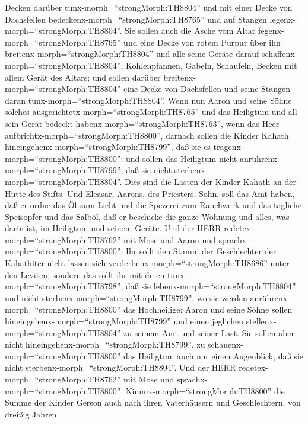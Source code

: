 Decken darüber tunx-morph=``strongMorph:TH8804'' und mit einer Decke von
Dachsfellen bedeckenx-morph=``strongMorph:TH8765'' und auf Stangen
legenx-morph=``strongMorph:TH8804''.  Sie sollen auch die
Asche vom Altar fegenx-morph=``strongMorph:TH8765'' und eine Decke von
rotem Purpur über ihn breitenx-morph=``strongMorph:TH8804''
 und alle seine Geräte darauf
schaffenx-morph=``strongMorph:TH8804'', Kohlenpfannen, Gabeln,
Schaufeln, Becken mit allem Gerät des Altars; und sollen darüber
breitenx-morph=``strongMorph:TH8804'' eine Decke von Dachsfellen und
seine Stangen daran tunx-morph=``strongMorph:TH8804''. 
Wenn nun Aaron und seine Söhne solches
ausgerichtetx-morph=``strongMorph:TH8765'' und das Heiligtum und all
sein Gerät bedeckt habenx-morph=``strongMorph:TH8763'', wenn das Heer
aufbrichtx-morph=``strongMorph:TH8800'', darnach sollen die Kinder
Kahath hineingehenx-morph=``strongMorph:TH8799'', daß sie es
tragenx-morph=``strongMorph:TH8800''; und sollen das Heiligtum nicht
anrührenx-morph=``strongMorph:TH8799'', daß sie nicht
sterbenx-morph=``strongMorph:TH8804''. Dies sind die Lasten der Kinder
Kahath an der Hütte des Stifts.  Und Eleasar, Aarons, des
Priesters, Sohn, soll das Amt haben, daß er ordne das Öl zum Licht und
die Spezerei zum Räuchwerk und das tägliche Speisopfer und das Salböl,
daß er beschicke die ganze Wohnung und alles, was darin ist, im
Heiligtum und seinem Geräte.  Und der HERR
redetex-morph=``strongMorph:TH8762'' mit Mose und Aaron und
sprachx-morph=``strongMorph:TH8800'':  Ihr sollt den Stamm
der Geschlechter der Kahathiter nicht lassen sich
verderbenx-morph=``strongMorph:TH8686'' unter den Leviten; 
sondern das sollt ihr mit ihnen tunx-morph=``strongMorph:TH8798'', daß
sie lebenx-morph=``strongMorph:TH8804'' und nicht
sterbenx-morph=``strongMorph:TH8799'', wo sie werden
anrührenx-morph=``strongMorph:TH8800'' das Hochheilige: Aaron und seine
Söhne sollen hineingehenx-morph=``strongMorph:TH8799'' und einen
jeglichen stellenx-morph=``strongMorph:TH8804'' zu seinem Amt und seiner
Last.  Sie sollen aber nicht
hineingehenx-morph=``strongMorph:TH8799'', zu
schauenx-morph=``strongMorph:TH8800'' das Heiligtum auch nur einen
Augenblick, daß sie nicht sterbenx-morph=``strongMorph:TH8804''.
 Und der HERR redetex-morph=``strongMorph:TH8762'' mit Mose
und sprachx-morph=``strongMorph:TH8800'': 
Nimmx-morph=``strongMorph:TH8800'' die Summe der Kinder Gerson auch nach
ihren Vaterhäusern und Geschlechtern,  von dreißig Jahren
